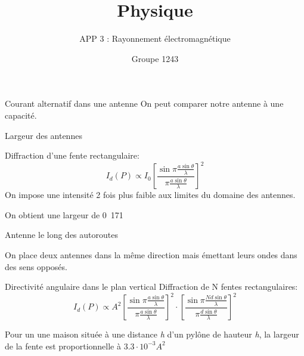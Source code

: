 \documentclass[pdf]{beamer}
\title{Physique}
\subtitle{APP 3 : Rayonnement électromagnétique}
\author{Groupe 1243}
\begin{document}
 
 
%
 
\begin{frame} 
	\titlepage 
 \end{frame} 
 
\begin{frame}{Courant alternatif dans une antenne}
On peut comparer notre antenne à une capacité.

\end{frame}

%
%

\begin{frame}{Largeur des antennes}
 	
Diffraction d'une fente rectangulaire:
$$I_d (P)\propto I_0 \left[  \frac{\sin \pi \frac{a \sin \theta}{\lambda}}{\pi \frac{a \sin \theta}{\lambda}}\right]^2  $$
On impose une intensité 2 fois plus faible aux limites du domaine des antennes.

On obtient une largeur de \unit{0.171}{\meter}

\end{frame}


\begin{frame}{Antenne le long des autoroutes}

On place deux antennes dans la même direction mais émettant leurs ondes dans des sens opposés.

\end{frame}

%
%

\begin{frame}{Directivité angulaire dans le plan vertical}
Diffraction de N fentes rectangulaires:
$$I_d (P)\propto A^2 \left[  \frac{\sin \pi \frac{a \sin \theta}{\lambda}}{\pi \frac{a \sin \theta}{\lambda}}\right]^2  \cdot \left[  \frac{\sin \pi \frac{N d \sin \theta}{\lambda}}{\pi \frac{d \sin \theta}{\lambda}}\right]^2 $$

Pour un une maison située à une distance \textit{h} d'un pylône de hauteur \textit{h}, la largeur de la fente est proportionnelle à $3.3 \cdot 10^{-3} A^2$ 

\end{frame}
\end{document}
